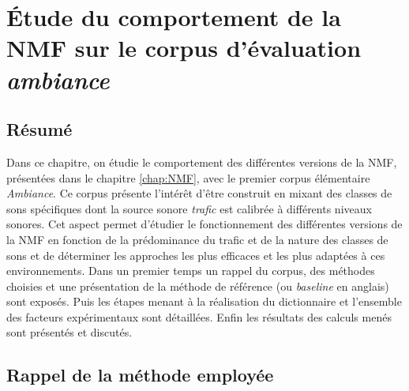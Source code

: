 
\chapter{\'Etude du comportement de la NMF sur le corpus d'évaluation \textit{ambiance}}
\label{chap:ambiance}

\section*{\centering Résumé}


\vspace{2cm}

Dans ce chapitre, on étudie le comportement des différentes versions de la NMF, présentées dans le chapitre \ref{chap:NMF},  avec le premier corpus élémentaire \textit{Ambiance}. Ce corpus présente l'intérêt d'être construit en mixant des classes de sons spécifiques dont la source sonore \textit{trafic} est calibrée à différents niveaux sonores. Cet aspect permet d'étudier le fonctionnement des différentes versions de la NMF en fonction de la prédominance du trafic et de la nature des classes de sons et de déterminer les approches les plus efficaces et les plus adaptées à ces environnements.
Dans un premier temps un rappel du corpus, des méthodes choisies et une présentation de la méthode de référence (ou \textit{baseline} en anglais) sont exposés. Puis les étapes menant à la réalisation du dictionnaire et l'ensemble des facteurs expérimentaux sont détaillées. Enfin les résultats des calculs menés sont présentés et discutés.


\section{Rappel de la méthode employée}

